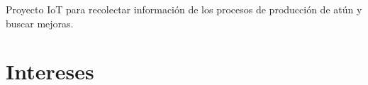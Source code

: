 \documentclass[]{plushcv}
\begin{document}
\begin{minipage}[t]{0.70\textwidth}
	\vspace{\topsep}	
	\begin{tightemize}
		\item Proyecto IoT para recolectar información de los procesos de producción de atún y buscar mejoras.
	\end{tightemize}
	
\end{minipage}
\hfill
\begin{minipage}[t]{0.25\textwidth} 
	
	\sectionsep
	
	\section{Intereses}
	\subsection{}
	\sectionsep
	
	
	
	
	

\end{minipage}
\end{document}
